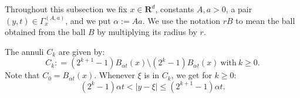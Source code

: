 \documentclass{amsart}
\theoremstyle{remark}
\renewcommand{\leq}{\leqslant}
\renewcommand{\leq}{\leqslant}
\renewcommand{\geq}{\geqslant}
\newcommand{\R}{\mathbf R}
\newcommand{\e}{\mathrm{e}} %
\renewcommand{\leq}{\leqslant}%
\renewcommand{\geq}{\geqslant}%
\newcommand{\red}{\color{red}}
\begin{document}
Throughout this subsection we fix $x\in \R^d$, constants $A,a>0$, a pair
$(y,t)\in \Gamma_x^{(A,a)}$, and we put $\alpha:=Aa$. 
We use the notation $rB$ to mean the ball obtained from the ball $B$ by
multiplying its radius by $r$.

The annuli $C_k$ are given by:
\begin{equation}
  \label{eq:C_k-annulus-decomposition}
  C_k : = (2^{k + 1} - 1)B_{\alpha t}(x) \setminus (2^k - 1)B_{\alpha t}(x)
  \:\text{with}\: k \geq 0.
\end{equation}
Note that $C_0 = B_{\alpha t}(x)$. Whenever $\xi$ is in $C_k$, we get for $k
\geq 0$:
\begin{equation}
  \label{eq:C_k-annulus-decomposition-expand}
  (2^k - 1)\alpha t < |y - \xi| \leq (2^{k + 1} - 1) \alpha t.
\end{equation}
\end{document}
